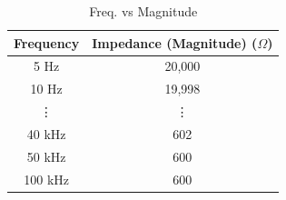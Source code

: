 \documentclass[12pt]{article}
\begin{document}
\captionsetup[table]{labelsep=colon, labelfont=bf} 	%
\renewcommand{\arraystretch}{1.2}	%
\begin{table}[H]
	\centering
	\caption{Freq. vs Magnitude \\ }
	\begin{tabular}{|c|c|}
		\hline
		\multicolumn{1}{|l|}{\textbf{Frequency}} & \multicolumn{1}{l|}{\textbf{Impedance (Magnitude) ($\Omega$)}} \\
		\hline
		5 Hz  & 20,000 \\
		10 Hz & 19,998 \\
		\vdots     & \vdots \\
		40 kHz & 602 \\
		50 kHz & 600 \\
		100 kHz & 600 \\
		\hline
	\end{tabular}
	\label{table:freqmag3}%
\end{table}%

\paperend
\end{document}
